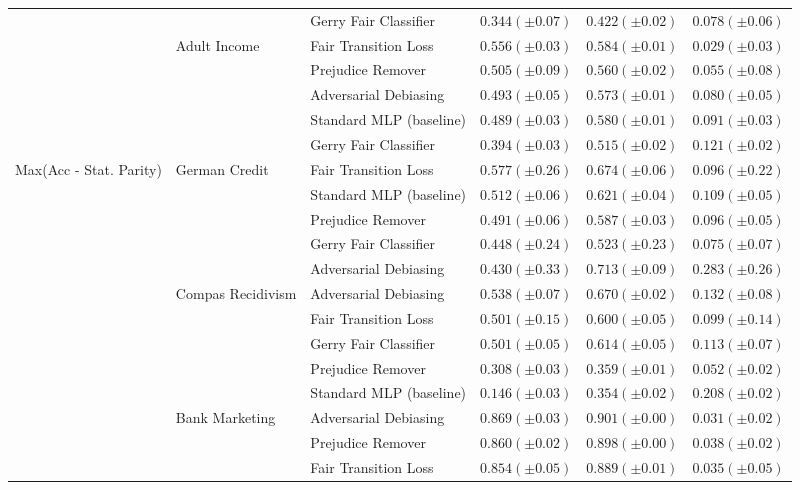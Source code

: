 \begin{tabular}{llllll}
 &  & Gerry Fair Classifier & $0.344 (\pm0.07)$ & $0.422 (\pm0.02)$ & $0.078 (\pm0.06)$ \\
\cline{2-6}
 & \multirow[t]{5}{*}{Adult Income} & Fair Transition Loss & $0.556 (\pm0.03)$ & $0.584 (\pm0.01)$ & $0.029 (\pm0.03)$ \\
 &  & Prejudice Remover & $0.505 (\pm0.09)$ & $0.560 (\pm0.02)$ & $0.055 (\pm0.08)$ \\
 &  & Adversarial Debiasing & $0.493 (\pm0.05)$ & $0.573 (\pm0.01)$ & $0.080 (\pm0.05)$ \\
 &  & Standard MLP (baseline) & $0.489 (\pm0.03)$ & $0.580 (\pm0.01)$ & $0.091 (\pm0.03)$ \\
 &  & Gerry Fair Classifier & $0.394 (\pm0.03)$ & $0.515 (\pm0.02)$ & $0.121 (\pm0.02)$ \\
\cline{1-6} \cline{2-6}
\multirow[t]{20}{*}{Max(Acc - Stat. Parity)} & \multirow[t]{5}{*}{German Credit} & Fair Transition Loss & $0.577 (\pm0.26)$ & $0.674 (\pm0.06)$ & $0.096 (\pm0.22)$ \\
 &  & Standard MLP (baseline) & $0.512 (\pm0.06)$ & $0.621 (\pm0.04)$ & $0.109 (\pm0.05)$ \\
 &  & Prejudice Remover & $0.491 (\pm0.06)$ & $0.587 (\pm0.03)$ & $0.096 (\pm0.05)$ \\
 &  & Gerry Fair Classifier & $0.448 (\pm0.24)$ & $0.523 (\pm0.23)$ & $0.075 (\pm0.07)$ \\
 &  & Adversarial Debiasing & $0.430 (\pm0.33)$ & $0.713 (\pm0.09)$ & $0.283 (\pm0.26)$ \\
\cline{2-6}
 & \multirow[t]{5}{*}{Compas Recidivism} & Adversarial Debiasing & $0.538 (\pm0.07)$ & $0.670 (\pm0.02)$ & $0.132 (\pm0.08)$ \\
 &  & Fair Transition Loss & $0.501 (\pm0.15)$ & $0.600 (\pm0.05)$ & $0.099 (\pm0.14)$ \\
 &  & Gerry Fair Classifier & $0.501 (\pm0.05)$ & $0.614 (\pm0.05)$ & $0.113 (\pm0.07)$ \\
 &  & Prejudice Remover & $0.308 (\pm0.03)$ & $0.359 (\pm0.01)$ & $0.052 (\pm0.02)$ \\
 &  & Standard MLP (baseline) & $0.146 (\pm0.03)$ & $0.354 (\pm0.02)$ & $0.208 (\pm0.02)$ \\
\cline{2-6}
 & \multirow[t]{5}{*}{Bank Marketing} & Adversarial Debiasing & $0.869 (\pm0.03)$ & $0.901 (\pm0.00)$ & $0.031 (\pm0.02)$ \\
 &  & Prejudice Remover & $0.860 (\pm0.02)$ & $0.898 (\pm0.00)$ & $0.038 (\pm0.02)$ \\
 &  & Fair Transition Loss & $0.854 (\pm0.05)$ & $0.889 (\pm0.01)$ & $0.035 (\pm0.05)$ \\

\end{tabular}
